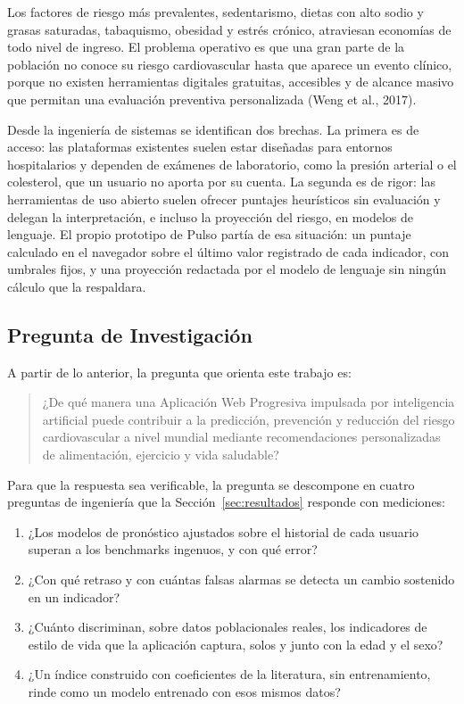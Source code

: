 \documentclass[12pt,letterpaper]{article}
\begin{document}
Los factores de riesgo más prevalentes, sedentarismo, dietas con alto sodio y
grasas saturadas, tabaquismo, obesidad y estrés crónico, atraviesan economías de
todo nivel de ingreso. El problema operativo es que una gran parte de la
población no conoce su riesgo cardiovascular hasta que aparece un evento clínico,
porque no existen herramientas digitales gratuitas, accesibles y de alcance
masivo que permitan una evaluación preventiva personalizada (Weng et al., 2017).

Desde la ingeniería de sistemas se identifican dos brechas. La primera es de
acceso: las plataformas existentes suelen estar diseñadas para entornos
hospitalarios y dependen de exámenes de laboratorio, como la presión arterial o
el colesterol, que un usuario no aporta por su cuenta. La segunda es de rigor:
las herramientas de uso abierto suelen ofrecer puntajes heurísticos sin
evaluación y delegan la interpretación, e incluso la proyección del riesgo, en
modelos de lenguaje. El propio prototipo de Pulso partía de esa situación: un
puntaje calculado en el navegador sobre el último valor registrado de cada
indicador, con umbrales fijos, y una proyección redactada por el modelo de
lenguaje sin ningún cálculo que la respaldara.

\subsection*{Pregunta de Investigación}

A partir de lo anterior, la pregunta que orienta este trabajo es:

\begin{quote}
¿De qué manera una Aplicación Web Progresiva impulsada por inteligencia
artificial puede contribuir a la predicción, prevención y reducción del riesgo
cardiovascular a nivel mundial mediante recomendaciones personalizadas de
alimentación, ejercicio y vida saludable?
\end{quote}

Para que la respuesta sea verificable, la pregunta se descompone en cuatro
preguntas de ingeniería que la Sección~\ref{sec:resultados} responde con
mediciones:

\begin{enumerate}[label=P\arabic*.]
  \item ¿Los modelos de pronóstico ajustados sobre el historial de cada usuario
    superan a los benchmarks ingenuos, y con qué error?
  \item ¿Con qué retraso y con cuántas falsas alarmas se detecta un cambio
    sostenido en un indicador?
  \item ¿Cuánto discriminan, sobre datos poblacionales reales, los indicadores
    de estilo de vida que la aplicación captura, solos y junto con la edad y el
    sexo?
  \item ¿Un índice construido con coeficientes de la literatura, sin
    entrenamiento, rinde como un modelo entrenado con esos mismos datos?
\end{enumerate}
\end{document}
